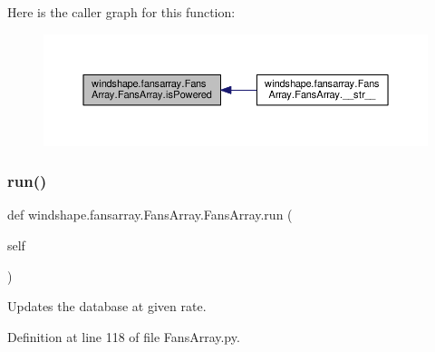 Here is the caller graph for this function\+:\nopagebreak
\begin{figure}[H]
\begin{center}
\leavevmode
\includegraphics[width=350pt]{classwindshape_1_1fansarray_1_1_fans_array_1_1_fans_array_ae9e1608f5d5faf5602a036983dec76ea_icgraph}
\end{center}
\end{figure}
\mbox{\label{classwindshape_1_1fansarray_1_1_fans_array_1_1_fans_array_afa94dcdf36ecce45c8189bb68fe8efe9}} 
\subsubsection{\texorpdfstring{run()}{run()}}
{\footnotesize\ttfamily def windshape.\+fansarray.\+Fans\+Array.\+Fans\+Array.\+run (\begin{DoxyParamCaption}\item[{}]{self }\end{DoxyParamCaption})}

\begin{DoxyVerb}Updates the database at given rate.\end{DoxyVerb}
 

Definition at line 118 of file Fans\+Array.\+py.

